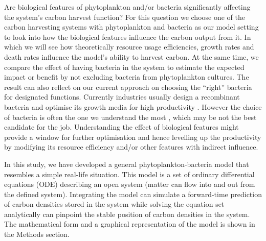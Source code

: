 \documentclass[../thesis.tex]{subfiles} %
\begin{document}
Are biological features of phytoplankton and/or bacteria significantly affecting the system’s carbon harvest function?  For this question we choose one of the carbon harvesting systems with phytoplankton and bacteria as our model setting to look into how the biological features influence the carbon output from it.  In which we will see how theoretically resource usage efficiencies, growth rates and death rates influence the model’s ability to harvest carbon.  At the same time, we compare the effect of having bacteria in the system to estimate the expected impact or benefit by not excluding bacteria from phytoplankton cultures.  The result can also reflect on our current approach on choosing the ``right” bacteria for designated functions.  Currently industries usually design a recombinant bacteria and optimise its growth media for high productivity \autocite{dash2013marine,naik2013lead,huang2012industrial,evanson_2019}.  However the choice of bacteria is often the one we understand the most \autocite{huang2012industrial}, which may be not the best candidate for the job.  Understanding the effect of biological features might provide a window for further optimisation and hence levelling up the productivity by modifying its resource efficiency and/or other features with indirect influence.

In this study, we have developed a general phytoplankton-bacteria model that resembles a simple real-life situation.  This model is a set of ordinary differential equations (ODE) describing an open system (matter can flow into and out from the defined system).  Integrating the model can simulate a forward-time prediction of carbon densities stored in the system while solving the equation set analytically can pinpoint the stable position of carbon densities in the system.  The mathematical form and a graphical representation of the model is shown in the Methods section.
\end{document}
